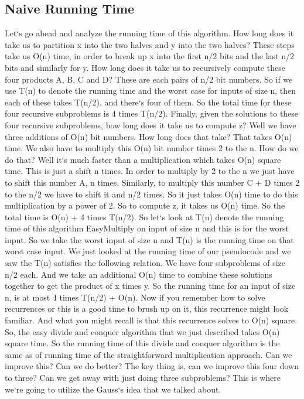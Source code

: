 \subsection{Naive  Running Time}
Let`s go ahead and analyze the running time of this algorithm.
How long does it take us to partition x into the two halves and y into the two halves? These steps take us O(n) time, in order to break up x into the first n/2 bits and the last n/2 bits and similarly for y.
How long does it take us to recursively compute these four products A, B, C and D? These are each pairs of n/2 bit numbers.
So if we use T(n) to denote the running time and the worst case for inputs of size n, then each of these takes T(n/2), and there`s four of them.
So the total time for these four recursive subproblems is 4 times T(n/2).
Finally, given the solutions to these four recursive subproblems, how long does it take us to compute z? Well we have three additions of O(n) bit numbers.
How long does that take? That takes O(n) time.
We also have to multiply this O(n) bit number times 2 to the n.
How do we do that? Well it`s much faster than a multiplication which takes O(n) square time.
This is just a shift n times.
In order to multiply by 2 to the n we just have to shift this number A, n times.
Similarly, to multiply this number C + D times 2 to the n/2 we have to shift it and n/2 times.
So it just takes O(n) time to do this multiplication by a power of 2.
So to compute z, it takes us O(n) time.
So the total time is O(n) + 4 times T(n/2).
So let`s look at T(n) denote the running time of this algorithm EasyMultiply on input of size n and this is for the worst input.
So we take the worst input of size n and T(n) is the running time on that worst case input.
We just looked at the running time of our pseudocode and we saw the T(n) satisfies the following relation.
We have four subproblems of size n/2 each.
And we take an additional O(n) time to combine these solutions together to get the product of x times y.
So the running time for an input of size n, is at most 4 times T(n/2) + O(n).
Now if you remember how to solve recurrences or this is a good time to brush up on it, this recurrence might look familiar.
And what you might recall is that this recurrence solves to O(n) square.
So, the easy divide and conquer algorithm that we just described takes O(n) square time.
So the running time of this divide and conquer algorithm is the same as of running time of the straightforward multiplication approach.
Can we improve this? Can we do better? The key thing is, can we improve this four down to three? Can we get away with just doing three subproblems? This is where we`re going to utilize the Gauss`s idea that we talked about.

